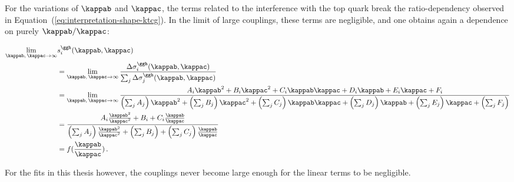 For the variations of $\kappab$ and $\kappac$, the terms related to the interference with the top quark break the ratio-dependency observed in Equation~(\ref{eq:interpretation-shape-ktcg}).
% 
In the limit of large couplings, these terms are negligible, and one obtains again a dependence on purely $\kappab/\kappac$:
% 
\begin{linenomath*}
\begin{equation}
\label{eq:interpretation-shape-kbkc}
\begin{split}
\lim_{\kappab,\,\kappac\to\infty} & s^{\ggh}_i(\kappab, \kappac) \\
        &=
        \lim_{\kappab,\,\kappac\to\infty}
        \frac
            {\Delta\sigma^{\ggh}_i(\kappab, \kappac)}
            {\sum_j \Delta\sigma^{\ggh}_j(\kappab, \kappac)}
            \\
        &=
        \lim_{\kappab,\,\kappac\to\infty}
        \frac
            {A_i \kappab^2 + B_i \kappac^2 + C_i \kappab \kappac
                + D_i \kappab + E_i \kappac + F_i
                }
            {
                \left(\sum_j A_j\right) \kappab^2
                + \left(\sum_j B_j\right) \kappac^2
                + \left(\sum_j C_j\right) \kappab\kappac
                + \left(\sum_j D_j\right) \kappab
                + \left(\sum_j E_j\right) \kappac
                + \left(\sum_j F_j\right)
                }
            \\
        &=
        \frac
            {A_i \frac{\kappab^2}{\kappac^2} + B_i + C_i \frac{\kappab}{\kappac}}
            {
                \left(\sum_j A_j\right) \frac{\kappab^2}{\kappac^2}
                + \left(\sum_j B_j\right) 
                + \left(\sum_j C_j\right) \frac{\kappab}{\kappac}
                }
            \\
        & = f(\frac{\kappab}{\kappac})
\,.
\end{split}
\end{equation}
\end{linenomath*}
% 
For the fits in this thesis however, the couplings never become large enough for the linear terms to be negligible.









